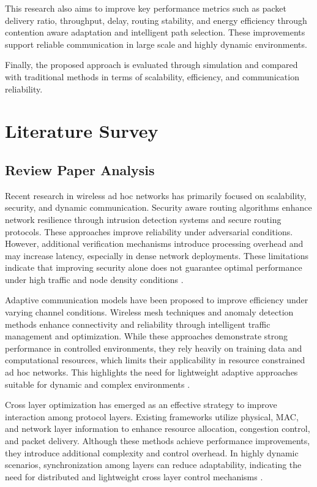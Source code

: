 \documentclass[a4paper,fleqn,final,1p]{cas-dc}
\numberwithin{equation}{section}
\begin{document}
This research also aims to improve key performance metrics such as packet delivery ratio, throughput, delay, routing stability, and energy efficiency through contention aware adaptation and intelligent path selection. These improvements support reliable communication in large scale and highly dynamic environments.

Finally, the proposed approach is evaluated through simulation and compared with traditional methods in terms of scalability, efficiency, and communication reliability.

\section{Literature Survey}

\subsection{Review Paper Analysis}

Recent research in wireless ad hoc networks has primarily focused on scalability, security, and dynamic communication. Security aware routing algorithms enhance network resilience through intrusion detection systems and secure routing protocols. These approaches improve reliability under adversarial conditions. However, additional verification mechanisms introduce processing overhead and may increase latency, especially in dense network deployments. These limitations indicate that improving security alone does not guarantee optimal performance under high traffic and node density conditions \cite{mashhadani2025security, qian2024wireless}.

Adaptive communication models have been proposed to improve efficiency under varying channel conditions. Wireless mesh techniques and anomaly detection methods enhance connectivity and reliability through intelligent traffic management and optimization. While these approaches demonstrate strong performance in controlled environments, they rely heavily on training data and computational resources, which limits their applicability in resource constrained ad hoc networks. This highlights the need for lightweight adaptive approaches suitable for dynamic and complex environments \cite{esteban2023anomaly, adanigboa2025energy}.

Cross layer optimization has emerged as an effective strategy to improve interaction among protocol layers. Existing frameworks utilize physical, MAC, and network layer information to enhance resource allocation, congestion control, and packet delivery. Although these methods achieve performance improvements, they introduce additional complexity and control overhead. In highly dynamic scenarios, synchronization among layers can reduce adaptability, indicating the need for distributed and lightweight cross layer control mechanisms \cite{prakash2024, priya2024, inzimam2024}.
\end{document}
